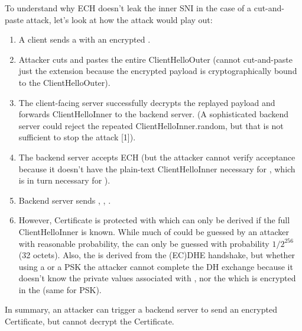 To understand why ECH doesn't leak the inner SNI in the case of a cut-and-paste attack, let's look at how the attack would play out:
\begin{enumerate}
    \item A client sends a  with an encrypted .
    \item Attacker cuts and pastes the entire ClientHelloOuter (cannot cut-and-paste just the  extension because the encrypted payload is cryptographically bound to the ClientHelloOuter).
    \item The client-facing server successfully decrypts the replayed  payload and forwards ClientHelloInner to the backend server. (A sophisticated backend server could reject the repeated ClientHelloInner.random, but that is not sufficient to stop the attack [1]).
    \item The backend server accepts ECH (but the attacker cannot verify acceptance because it doesn't have the plain-text ClientHelloInner necessary for , which is in turn necessary for ).
    \item Backend server sends , , .
    \item However, {Certificate} is protected with \var{\shts} which can only be derived if the full ClientHelloInner is known. While much of  could be guessed by an attacker with reasonable probability, the  can only be guessed with probability $1/2^{256}$ (32 octets). Also, the \var{\shts} is derived from the (EC)DHE handshake, but whether using a  or a PSK the attacker cannot complete the DH exchange because it doesn't know the private values associated with , nor the  which is encrypted in the  (same for PSK).
\end{enumerate}


In summary, an attacker can trigger a backend server to send an encrypted {Certificate}, but cannot decrypt the {Certificate}.



